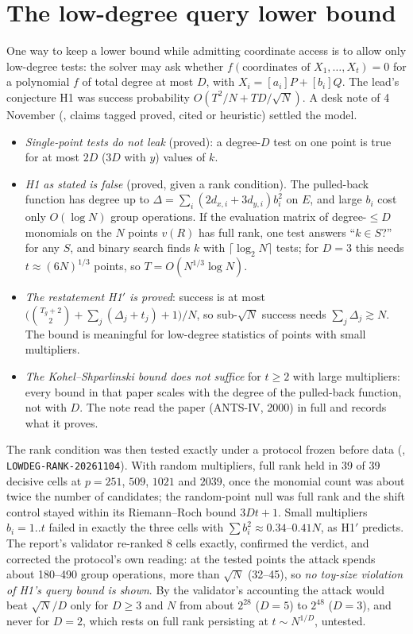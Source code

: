 \section{The low-degree query lower bound}\label{sec:um-lowdeg}

One way to keep a lower bound while admitting coordinate access is to
allow only low-degree tests: the solver may ask whether
$f(\text{coordinates of }X_1,\dots,X_t)=0$ for a polynomial $f$ of total
degree at most $D$, with $X_i=[a_i]P+[b_i]Q$. The lead's conjecture H1 was
success probability $O(T^2/N+TD/\sqrt N)$. A desk note of 4 November
(,
claims tagged proved, cited or heuristic) settled the model.
\begin{itemize}
\item \emph{Single-point tests do not leak} (proved): a degree-$D$ test on
  one point is true for at most $2D$ ($3D$ with $y$) values of $k$.
\item \emph{H1 as stated is false} (proved, given a rank condition). The
  pulled-back function has degree up to
  $\Delta=\sum_i(2d_{x,i}+3d_{y,i})b_i^2$ on $E$, and large $b_i$ cost only
  $O(\log N)$ group operations. If the evaluation matrix of degree-$\le D$
  monomials on the $N$ points $v(R)$ has full rank, one test answers
  ``$k\in S$?'' for any $S$, and binary search finds $k$ with
  $\lceil\log_2N\rceil$ tests; for $D=3$ this needs $t\approx(6N)^{1/3}$
  points, so $T=O(N^{1/3}\log N)$.
\item \emph{The restatement H1$'$ is proved}: success is at most
  $\bigl(\binom{T_g+2}2+\sum_j(\Delta_j+t_j)+1\bigr)/N$, so sub-$\sqrt N$
  success needs $\sum_j\Delta_j\gtrsim N$. The bound is meaningful for
  low-degree statistics of points with small multipliers.
\item \emph{The Kohel--Shparlinski bound does not suffice} for $t\ge2$ with
  large multipliers: every bound in that paper scales with the degree of the
  pulled-back function, not with $D$. The note read the paper (ANTS-IV,
  2000) in full and records what it proves.
\end{itemize}

The rank condition was then tested exactly under a protocol frozen before
data (,
\texttt{LOWDEG-RANK-20261104}). With random multipliers, full rank held in
39 of 39 decisive cells at $p=251$, $509$, $1021$ and $2039$, once the
monomial count was about twice the number of candidates; the
random-point null was full rank and the shift control stayed within its
Riemann--Roch bound $3Dt+1$. Small multipliers $b_i=1..t$ failed in exactly
the three cells with $\sum b_i^2\approx0.34$--$0.41N$, as H1$'$ predicts. The
report's validator re-ranked 8 cells exactly, confirmed the verdict, and
corrected the protocol's own reading: at the tested points the attack spends
about 180--490 group operations, more than $\sqrt N$ (32--45), so \emph{no
toy-size violation of H1's query bound is shown}. By the validator's
accounting the attack would beat $\sqrt N/D$ only for $D\ge3$ and $N$ from
about $2^{28}$ ($D=5$) to $2^{48}$ ($D=3$), and never for $D=2$, which rests on
full rank persisting at $t\sim N^{1/D}$, untested.

